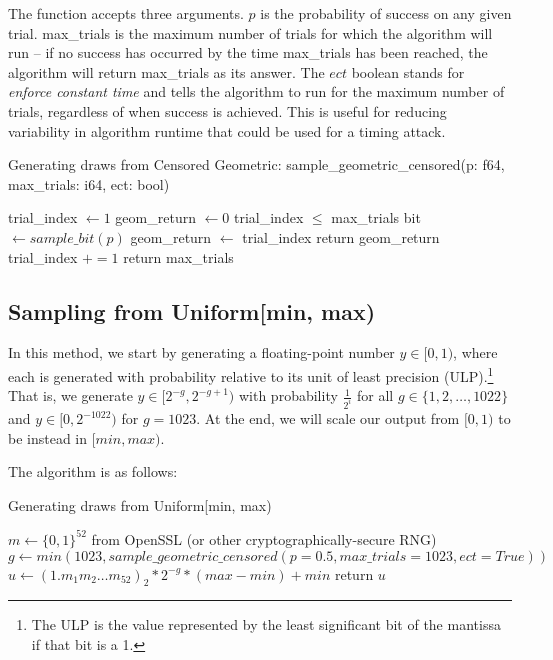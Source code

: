 \documentclass[11pt]{scrartcl} %
\begin{document}
The function accepts three arguments. $p$ is the probability of success on any given trial. max\_trials is the maximum number of 
trials for which the algorithm will run -- if no success has occurred by the time max\_trials has been reached, the algorithm 
will return max\_trials as its answer. 
The $ect$ boolean stands for \emph{enforce constant time} and tells the algorithm to run for the maximum number 
of trials, regardless of when success is achieved. This is useful for reducing variability in algorithm runtime that could be used 
for a timing attack. 
\begin{algorithm}[H]
	\caption{Generating draws from Censored Geometric: \newline sample\_geometric\_censored(p: f64, max\_trials: i64, ect: bool)}
	\label{alg:censored_geom_p}
	\begin{algorithmic}[1]
		\State trial\_index $\gets 1$
		\State geom\_return $\gets 0$
		\While trial\_index $\leq$ max\_trials
			\State bit $\gets sample\_bit(p)$
				 
					\State geom\_return $\gets$ trial\_index
					 
						\State return geom\_return 
					\EndIf
				\EndIf
			\Else
				\State trial\_index $+= 1$
			\EndIf
		\EndWhile
		 
			\State return max\_trials 
		\EndIf
	\end{algorithmic}
\end{algorithm}

\subsection{Sampling from Uniform[min, max)}
\label{subsec:unif_sampling}
In this method, we start by generating a floating-point number $y \in [0,1)$,
where each is generated with probability relative to its unit of least precision (ULP).\footnote{The ULP is the value
represented by the least significant bit of the mantissa if that bit is a 1.} 
That is, we generate $y \in [2^{-g}, 2^{-g+1})$ with probability $\frac{1}{2^i}$
for all $g \in \{1,2,\hdots,1022\}$ and $y \in [0, 2^{-1022})$ for $g = 1023$.
At the end, we will scale our output from $[0,1)$ to be instead in $[min, max)$. \newline 

The algorithm is as follows:
\begin{algorithm}[H]
	\caption{Generating draws from Uniform[min, max)}
	\label{alg:unif_min_max}
	\begin{algorithmic}[1]
		\State $m \gets \{0, 1\}^{52}$ from OpenSSL (or other cryptographically-secure RNG)
		\State $g \gets min(1023, sample\_geometric\_censored(p = 0.5, max\_trials = 1023, ect = True))$
		\State $u \gets (1.m_1m_2 \hdots m_{52})_2 * 2^{-g} * (max - min) + min$
		\State return $u$
	\end{algorithmic}
\end{algorithm}
\end{document}
